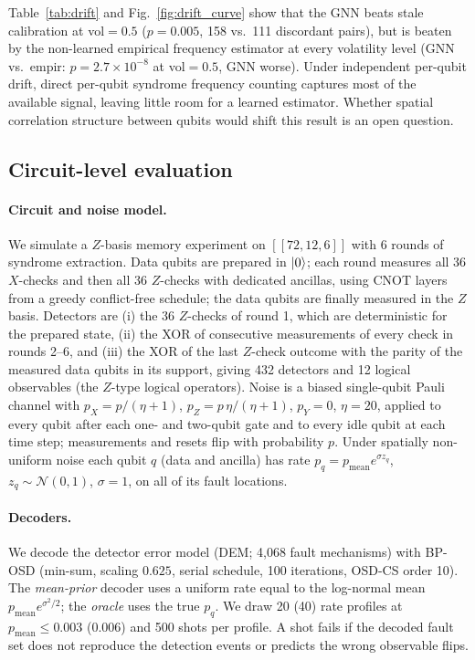 \documentclass[a4paper,twocolumn,11pt,nopdfoutputerror]{quantumarticle}
\newcommand{\code}[3]{\ensuremath{[\![#1,#2,#3]\!]}}
\begin{document}
Table~\ref{tab:drift} and Fig.~\ref{fig:drift_curve} show that the GNN beats stale calibration
at vol$=0.5$ ($p=0.005$, 158 vs.\ 111 discordant pairs), but
is beaten by the non-learned empirical frequency estimator at
every volatility level (GNN vs.\ empir: $p = 2.7\times10^{-8}$
at vol$=0.5$, GNN worse). Under independent per-qubit drift,
direct per-qubit syndrome frequency counting captures most of
the available signal, leaving little room for a learned estimator.
Whether spatial correlation structure between qubits would shift
this result is an open question.

\subsection{Circuit-level evaluation}\label{sec:circuit}

\paragraph{Circuit and noise model.}
We simulate a $Z$-basis memory experiment on $\code{72}{12}{6}$ with
6 rounds of syndrome extraction. Data qubits are prepared in $\ket{0}$;
each round measures all 36 $X$-checks and then all 36 $Z$-checks with
dedicated ancillas, using CNOT layers from a greedy conflict-free schedule;
the data qubits are finally measured in the $Z$ basis. Detectors are
(i) the 36 $Z$-checks of round 1, which are deterministic for the prepared
state, (ii) the XOR of consecutive measurements of every check in rounds
2--6, and (iii) the XOR of the last $Z$-check outcome with the parity of the
measured data qubits in its support, giving 432 detectors and 12 logical
observables (the $Z$-type logical operators). Noise is a biased single-qubit
Pauli channel with $p_X=p/(\eta+1)$, $p_Z=p\,\eta/(\eta+1)$, $p_Y=0$,
$\eta=20$, applied to every qubit after each one- and two-qubit gate and to
every idle qubit at each time step; measurements and resets flip with
probability $p$. Under spatially non-uniform noise each qubit $q$ (data and
ancilla) has rate $p_q=p_\mathrm{mean}e^{\sigma z_q}$, $z_q\sim\mathcal N(0,1)$,
$\sigma=1$, on all of its fault locations.

\paragraph{Decoders.}
We decode the detector error model (DEM; 4{,}068 fault mechanisms) with
BP-OSD (min-sum, scaling $0.625$, serial schedule, 100 iterations, OSD-CS
order 10). The \emph{mean-prior} decoder uses a uniform rate equal to the
log-normal mean $p_\mathrm{mean}e^{\sigma^2/2}$; the \emph{oracle} uses the
true $p_q$. We draw 20 (40) rate profiles at $p_\mathrm{mean}\le0.003$
($0.006$) and 500 shots per profile. A shot fails if the decoded fault set
does not reproduce the detection events or predicts the wrong observable flips.
\end{document}
